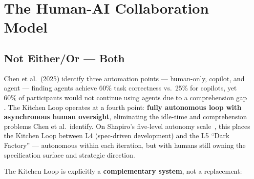 \documentclass[11pt,a4paper]{article}
\begin{document}
\section{The Human-AI Collaboration Model}\label{sec:human-ai-collaboration-model}

\subsection{Not Either/Or --- Both}\label{sec:not-eitheror-both}

Chen et al.~(2025) identify three automation points --- human-only, copilot, and agent --- finding agents achieve 60\% task correctness vs.~25\% for copilots, yet 60\% of participants would not continue using agents due to a comprehension gap \cite{chen2025}. The Kitchen Loop operates at a fourth point: \textbf{fully autonomous loop with asynchronous human oversight}, eliminating the idle-time and comprehension problems Chen et al.~identify. On Shapiro's five-level autonomy scale~\cite{shapiro2026}, this places the Kitchen Loop between L4 (spec-driven development) and the L5 ``Dark Factory'' --- autonomous within each iteration, but with humans still owning the specification surface and strategic direction.

The Kitchen Loop is explicitly a \textbf{complementary system}, not a replacement:
\end{document}
